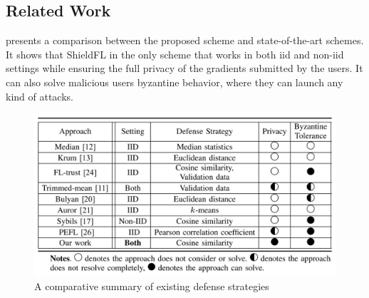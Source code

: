 \subsection{Related Work}
\label{sec:related-work}

 presents a comparison between the proposed scheme and state-of-the-art schemes.
It shows that ShieldFL in the only scheme that works in both \ac{iid} and non-\ac{iid} settings while ensuring the full privacy of the gradients submitted by the users.
It can also solve malicious users byzantine behavior, where they can launch any kind of attacks. 

\begin{figure}[thb]
\centering
  \includegraphics[width=0.8\linewidth]{resources/state-of-the-art-comarison.pdf}
  \caption{A comparative summary of existing defense strategies}
  \label{fig:comparison-with-state-of-the-art-schemes}
\end{figure}
